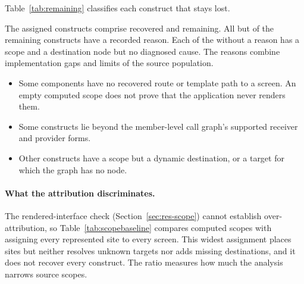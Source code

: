 Table~\ref{tab:remaining} classifies each construct that stays lost.

\begin{table}[t]\small
\caption{Why attribution losses remain after attribution.}
\label{tab:remaining}
\TabRemaining
\end{table}

The \AttrLost{} assigned constructs comprise \AttrRecovered{} recovered and \AttrRemaining{}
remaining. All but \AttrRemainingUnexplained{} of the remaining constructs have a recorded reason.
Each of the \AttrRemainingUnexplained{} without a reason has a scope and a destination node but no
diagnosed cause.
The reasons combine implementation gaps and limits of the source population.

\begin{itemize}
\item Some components have no recovered route or template path to a screen. An empty
computed scope does not prove that the application never renders them.
\item Some constructs lie beyond the member-level call graph's supported receiver and provider forms.
\item Other constructs have a scope but a dynamic destination, or a target for which the graph has no
node.
\end{itemize}

\paragraph{What the attribution discriminates.}
\label{sec:res-width}

The rendered-interface check (Section~\ref{sec:res-scope}) cannot establish over-attribution, so Table~\ref{tab:scopebaseline}
compares computed scopes with assigning every represented site to every screen. This widest
assignment places sites but neither resolves unknown targets nor adds missing destinations, and it
does not recover every construct. The ratio measures how much the analysis narrows source scopes.

\begin{table}[t]\small
\caption{The computed attribution against scope $\top$ for every site.}
\label{tab:scopebaseline}
\TabScopeBaseline
\par{}
\end{table}

